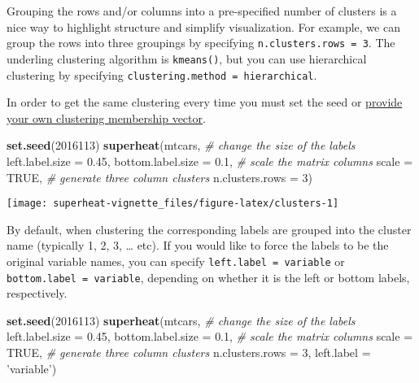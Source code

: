 \documentclass[]{book}
\newenvironment{Shaded}{\begin{snugshade}}{\end{snugshade}}
\newcommand{\KeywordTok}[1]{\textcolor[rgb]{0.13,0.29,0.53}{\textbf{{#1}}}}
\newcommand{\DataTypeTok}[1]{\textcolor[rgb]{0.13,0.29,0.53}{{#1}}}
\newcommand{\DecValTok}[1]{\textcolor[rgb]{0.00,0.00,0.81}{{#1}}}
\newcommand{\FloatTok}[1]{\textcolor[rgb]{0.00,0.00,0.81}{{#1}}}
\newcommand{\StringTok}[1]{\textcolor[rgb]{0.31,0.60,0.02}{{#1}}}
\newcommand{\CommentTok}[1]{\textcolor[rgb]{0.56,0.35,0.01}{\textit{{#1}}}}
\newcommand{\OtherTok}[1]{\textcolor[rgb]{0.56,0.35,0.01}{{#1}}}
\newcommand{\NormalTok}[1]{{#1}}
\theoremstyle{definition}
\theoremstyle{definition}
\theoremstyle{remark}
\begin{document}
Grouping the rows and/or columns into a pre-specified number of clusters
is a nice way to highlight structure and simplify visualization. For
example, we can group the rows into three groupings by specifying
\texttt{n.clusters.rows\ =\ 3}. The underling clustering algorithm is
\texttt{kmeans()}, but you can use hierarchical clustering by specifying
\texttt{clustering.method\ =\ \textquotesingle{}hierarchical\textquotesingle{}}.

In order to get the same clustering every time you must set the seed or
\protect\hyperlink{membership-vector}{provide your own clustering
membership vector}.

\begin{Shaded}
\begin{Highlighting}[]
\KeywordTok{set.seed}\NormalTok{(}\DecValTok{2016113}\NormalTok{)}
\KeywordTok{superheat}\NormalTok{(mtcars,}
          \CommentTok{# change the size of the labels}
          \DataTypeTok{left.label.size =} \FloatTok{0.45}\NormalTok{,}
          \DataTypeTok{bottom.label.size =} \FloatTok{0.1}\NormalTok{,}
          \CommentTok{# scale the matrix columns}
          \DataTypeTok{scale =} \OtherTok{TRUE}\NormalTok{,}
          \CommentTok{# generate three column clusters}
          \DataTypeTok{n.clusters.rows =} \DecValTok{3}\NormalTok{)}
\end{Highlighting}
\end{Shaded}

\begin{center}\texttt{[image: superheat-vignette\_files/figure-latex/clusters-1]} \end{center}

By default, when clustering the corresponding labels are grouped into
the cluster name (typically 1, 2, 3, \ldots{} etc). If you would like to
force the labels to be the original variable names, you can specify
\texttt{left.label\ =\ \textquotesingle{}variable\textquotesingle{}} or
\texttt{bottom.label\ =\ \textquotesingle{}variable}, depending on
whether it is the left or bottom labels, respectively.

\begin{Shaded}
\begin{Highlighting}[]
\KeywordTok{set.seed}\NormalTok{(}\DecValTok{2016113}\NormalTok{)}
\KeywordTok{superheat}\NormalTok{(mtcars,}
          \CommentTok{# change the size of the labels}
          \DataTypeTok{left.label.size =} \FloatTok{0.45}\NormalTok{,}
          \DataTypeTok{bottom.label.size =} \FloatTok{0.1}\NormalTok{,}
          \CommentTok{# scale the matrix columns}
          \DataTypeTok{scale =} \OtherTok{TRUE}\NormalTok{,}
          \CommentTok{# generate three column clusters}
          \DataTypeTok{n.clusters.rows =} \DecValTok{3}\NormalTok{,}
          \DataTypeTok{left.label =} \StringTok{'variable'}\NormalTok{)}
\end{Highlighting}
\end{Shaded}
\end{document}
